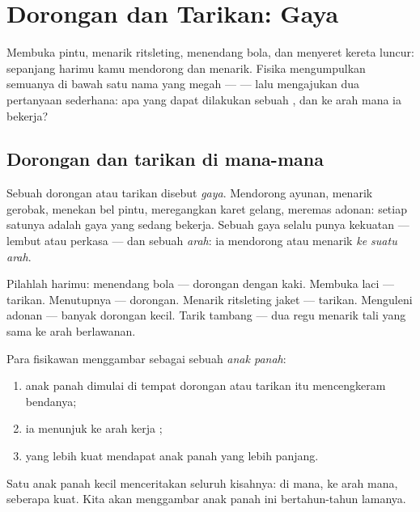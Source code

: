 \chapter{Dorongan dan Tarikan: Gaya}\label{ch:g2:pushes-and-pulls}

Membuka pintu, menarik ritsleting, menendang bola, dan menyeret
kereta luncur: sepanjang harimu kamu mendorong dan menarik. Fisika
mengumpulkan semuanya di bawah satu nama yang megah ---  --- lalu
mengajukan dua pertanyaan sederhana: apa yang dapat dilakukan sebuah
, dan ke arah mana ia bekerja?

\section{Dorongan dan tarikan di mana-mana}

\begin{definition}[Gaya]\label{def:g2:pushes-and-pulls:force}
Sebuah dorongan atau tarikan disebut \emph{gaya}.
Mendorong ayunan, menarik gerobak, menekan bel pintu,
meregangkan karet gelang, meremas adonan: setiap satunya adalah gaya yang sedang
bekerja. Sebuah gaya selalu punya kekuatan --- lembut atau perkasa ---
dan sebuah \emph{arah}: ia mendorong atau menarik \emph{ke suatu arah}.
\end{definition}

\begin{example}\label{ex:g2:pushes-and-pulls:sort}
Pilahlah harimu: menendang bola --- dorongan dengan kaki. Membuka
laci --- tarikan. Menutupnya --- dorongan. Menarik ritsleting jaket
--- tarikan. Menguleni adonan --- banyak dorongan kecil. Tarik tambang
--- dua regu menarik tali yang sama ke arah berlawanan.
\end{example}

\begin{method}\label{met:g2:pushes-and-pulls:arrow}
Para fisikawan menggambar  sebagai sebuah \emph{anak panah}:
\begin{enumerate}
  \item anak panah dimulai di tempat dorongan atau tarikan itu
        mencengkeram bendanya;
  \item ia menunjuk ke arah kerja ;
  \item {} yang lebih kuat mendapat anak panah yang lebih panjang.
\end{enumerate}
Satu anak panah kecil menceritakan seluruh kisahnya: di mana, ke arah
mana, seberapa kuat. Kita akan menggambar anak panah ini
bertahun-tahun lamanya.
\end{method}

